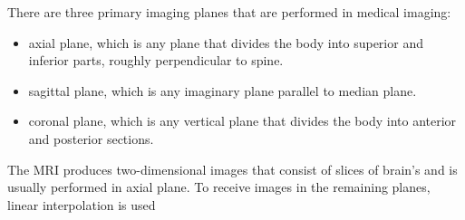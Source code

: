 There are three primary imaging planes that are performed in medical
imaging: 
\begin{itemize}
\item axial plane, which is any plane that divides the body into superior
and inferior parts, roughly perpendicular to spine. 
\item sagittal plane, which is any imaginary plane parallel to median plane. 
\item coronal plane, which is any vertical plane that divides the body into
anterior and posterior sections. 
\end{itemize}
The MRI produces two-dimensional images that consist of slices of
brain's and is usually performed in axial plane. To receive images
in the remaining planes, linear interpolation is used